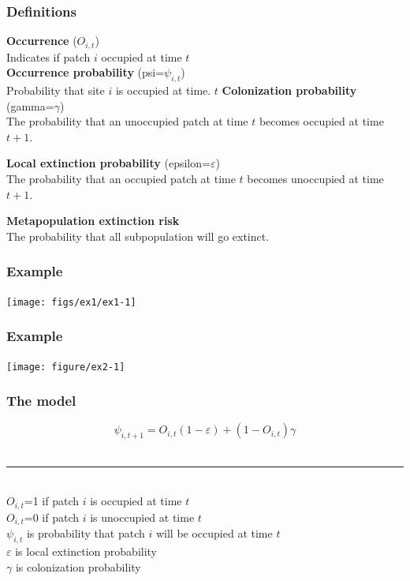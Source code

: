 \documentclass[color=usenames,dvipsnames]{beamer}\usepackage[]{graphicx}\usepackage[]{color}
\newenvironment{knitrout}{}{} %
\begin{document}
\begin{frame}
  \frametitle{Definitions}
  {\bf Occurrence} ($O_{i,t}$) \\
  Indicates if patch $i$ occupied at time $t$  \\
  \pause
  \vfill
  {\bf Occurrence probability} (psi=$\psi_{i,t}$) \\
  Probability that site $i$ is occupied at time. $t$
  \pause
  \vfill
  {\bf Colonization probability} (gamma=$\gamma$) \\
  The probability that an unoccupied patch at time $t$ becomes occupied
  at time $t+1$. \par
  \pause
  \vfill
  {\bf Local extinction probability} (epsilon=$\varepsilon$) \\
  The probability that an occupied patch at time $t$ becomes
  unoccupied at time $t+1$. \par
  \pause
  \vfill
  {\bf Metapopulation extinction risk} \\
  The probability that all subpopulation will go extinct.
\end{frame}




\begin{frame}[fragile]
  \frametitle{Example}
  \vspace{-1cm}

\texttt{[image: figs/ex1/ex1-1]}
\end{frame}



\begin{frame}[fragile]
  \frametitle{Example}
\begin{knitrout}
\color{fgcolor}

\texttt{[image: figure/ex2-1]} \hfill{}


\end{knitrout}
\end{frame}







\begin{frame}
  \frametitle{The model}
  \[
    \psi_{i,t+1} = O_{i,t}(1-\varepsilon) + (1-O_{i,t})\gamma
  \]
   \\
  \vspace{0.5cm}
  \rule{0.5\textwidth}{1pt} \\
  $O_{i,t}$=1 if patch $i$ is occupied at time $t$ \\
  $O_{i,t}$=0 if patch $i$ is unoccupied at time $t$ \\
  $\psi_{i,t}$ is probability that patch $i$ will be occupied at time
  $t$ \\
  $\varepsilon$ is local extinction probability \\
  $\gamma$ is colonization probability
\end{frame}
\end{document}
